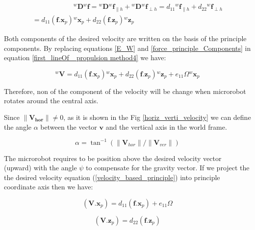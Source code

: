 \documentclass[12pt,a4paper,titlepage]{report}
\begin{document}
\begin{multline}
\qquad \qquad     \qquad   {^{w}\bm{D}} {^{w}\bm{f}} = {^{w}\bm{D}} {^{w}\bm{f}}_{\parallel h} + {^{w}\bm{D}} {^{w}\bm{f}}_{\perp h}
= d_{11} {^{w}\bm{f}}_{\parallel h} + d_{22}  {^{w}\bm{f}}_{\perp h}\\ 
= d_{11} \left ({\bm{f} . {\bm{x}}_p   }  \right) {^{w}\bm{x}}_p + 
 d_{22} \left ({\bm{f} . {\bm{z}}_p   }  \right) {^{w}\bm{z}}_p  \qquad \qquad
\label{force_principle_Components}
\end{multline} 

Both components  of the desired velocity are written on the basis of the principle components.
By replacing equations \ref{E_W} and \ref{force_principle_Components} in equation \ref{first_lineOf_ propulsion method4} we have:



\begin{equation}
^{w}\bm{V}  =   d_{11} \left ({\bm{f} . {\bm{x}}_p   }  \right) {^{w}\bm{x}}_p + 
 d_{22} \left ({\bm{f} . {\bm{z}}_p   }  \right) {^{w}\bm{z}}_p + e_{11} \Omega {^{w}{\bm{x}_p}}
\label{velocity_based_principle}  
\end{equation}

Therefore, non of the component of the velocity will be change when microrobot rotates around the central
axis. 

Since ${\| \bm{{V}_{hor}}\|} \neq 0$, as it is shown in the Fig \ref{horiz_verti_velocity} we can define 
the angle $\alpha$ between the vector $\bm{v}$ and the vertical axis in the world frame.



\begin{equation}
\alpha = {\tan}^{-1} ({\| \bm{V}_{hor} \|} / {\| \bm{V}_{ver} \|})
\label{alpha_velocity}  
\end{equation}

The microrobot requires to be position above the desired velocity vector (upward) with the angle $\psi$ 
 to compensate for the gravity vector. If we project the the desired velocity equation (\ref{velocity_based_principle})
into principle coordinate axis then we have:


\begin{equation}
(\bm{V} . \bm{x}_p) = d_{11} \left ({\bm{f} . {\bm{x}}_p   }  \right) + e_{11} \Omega 
\label{Xp_velocity}  
\end{equation}




\begin{equation}
(\bm{V} . \bm{z}_p) = d_{22} \left ({\bm{f} . {\bm{z}}_p   }  \right)
\label{Xz_velocity}  
\end{equation}
\end{document}
